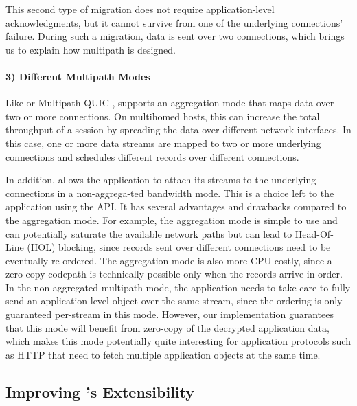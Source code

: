 This second type of migration does not require application-level
acknowledgments, but it cannot survive from one of the
underlying connections' failure. During such a migration, data is sent over two
connections, which brings us to explain how multipath is designed.

\paragraph*{3) Different Multipath Modes}
Like \mptcp \cite{raiciu2012hard,rfc6824} or Multipath QUIC \cite{de2017multipath,draft-liu-multipath-quic-02}, \tcpls supports an aggregation mode that maps data over two or more \tcp connections. On multihomed hosts, this can increase the total throughput of a \tcpls session by spreading the data over different network interfaces. In this case, one or more data streams are mapped to two or more underlying \tcp connections and \tcpls schedules different records over different connections.

In addition, \tcpls allows the application to attach its streams to the
underlying \tcp connections in a non-aggrega-ted bandwidth mode. This is a choice left to the application using the API. It has several advantages and drawbacks compared to the aggregation mode. For example, the aggregation mode is simple to use and can potentially saturate the available network paths but can lead to Head-Of-Line (HOL) blocking, since records sent over different \tcp connections need to be eventually re-ordered. The aggregation mode is also more CPU costly, since a zero-copy codepath is technically possible only when the records arrive in order. In the non-aggregated multipath mode, the application needs to take care to fully send an application-level object over the same stream, since the ordering is only guaranteed per-stream in this mode. However, our \tcpls implementation guarantees that this mode will benefit from zero-copy of the decrypted application data, which makes this mode potentially quite interesting for application protocols such as HTTP that need to fetch multiple application objects at the same time.

\subsection{Improving \tcp's Extensibility}

